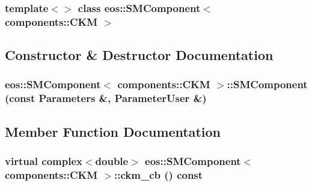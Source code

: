\subsubsection*{template$<$$>$ class eos::SMComponent$<$ components::CKM $>$}



\subsection{Constructor \& Destructor Documentation}
\hypertarget{classeos_1_1SMComponent_3_01components_1_1CKM_01_4_a89937ea05211033cd7365fc9a026f276}{
\subsubsection[{SMComponent}]{\setlength{\rightskip}{0pt plus 5cm}eos::SMComponent$<$ components::CKM $>$::SMComponent (const {\bf Parameters} \&, \/  {\bf ParameterUser} \&)}}
\label{classeos_1_1SMComponent_3_01components_1_1CKM_01_4_a89937ea05211033cd7365fc9a026f276}


\subsection{Member Function Documentation}
\hypertarget{classeos_1_1SMComponent_3_01components_1_1CKM_01_4_a001e9ea6af4bcd20dde06bf894d3cbb5}{
\subsubsection[{ckm\_\-cb}]{\setlength{\rightskip}{0pt plus 5cm}virtual complex$<$double$>$ eos::SMComponent$<$ components::CKM $>$::ckm\_\-cb () const}}
\label{classeos_1_1SMComponent_3_01components_1_1CKM_01_4_a001e9ea6af4bcd20dde06bf894d3cbb5}


